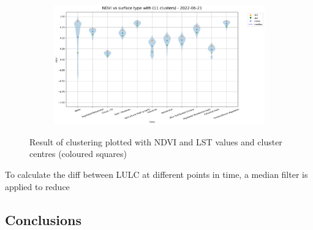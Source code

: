 \documentclass[12pt,a4paper, english,twoside]{scrartcl}
\begin{document}
\begin{figure}[!p]
\begin{subfigure}[b]{\textwidth}
         \label{fig:ndviclass01}
     \end{subfigure}
     \begin{subfigure}[b]{\textwidth}
         \centering
         \includegraphics[width=\textwidth]{img/NDVI vs surface type with (11 clusters) - 2022-06-21.png}
         \label{fig:ndviclass02}
     \end{subfigure}
          \caption{Result of clustering plotted with \gls{NDVI} and \gls{LST} values and cluster centres (coloured squares)\label{fig:ndvilstclusters}}
        \end{figure}
   

      \noindent
      To calculate the diff between \gls{LULC} at different points in time, a median filter is applied to reduce
      
 \subsection{Conclusions}
\end{document}
